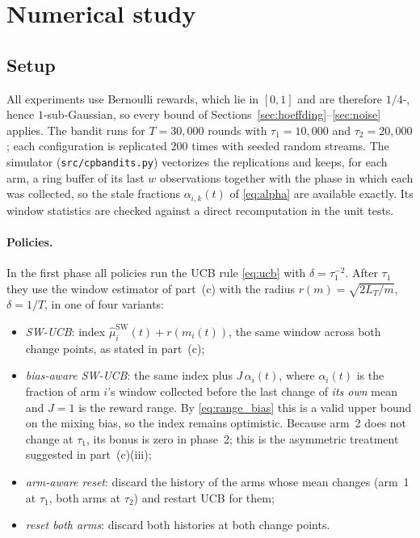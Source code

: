 \section{Numerical study}\label{sec:experiments}

\subsection{Setup}

All experiments use Bernoulli rewards, which lie in $[0,1]$ and are therefore $1/4$-, hence $1$-sub-Gaussian, so every bound of Sections~\ref{sec:hoeffding}--\ref{sec:noise} applies. The bandit runs for $T=30{,}000$ rounds with $\tau_1=10{,}000$ and $\tau_2=20{,}000$; each configuration is replicated $200$ times with seeded random streams. The simulator (\texttt{src/cpbandits.py}) vectorizes the replications and keeps, for each arm, a ring buffer of its last $w$ observations together with the phase in which each was collected, so the stale fractions $\alpha_{i,k}(t)$ of \eqref{eq:alpha} are available exactly. Its window statistics are checked against a direct recomputation in the unit tests.

\paragraph{Policies.} In the first phase all policies run the UCB rule \eqref{eq:ucb} with $\delta=\tau_1^{-2}$. After $\tau_1$ they use the window estimator of part~(c) with the radius $r(m)=\sqrt{2L_T/m}$, $\delta=1/T$, in one of four variants:
\begin{itemize}
\item \emph{SW-UCB}: index $\widehat\mu_i^{\mathrm{SW}}(t)+r(m_i(t))$, the same window across both change points, as stated in part~(c);
\item \emph{bias-aware SW-UCB}: the same index plus $J\,\alpha_i(t)$, where $\alpha_i(t)$ is the fraction of arm $i$'s window collected before the last change of \emph{its own} mean and $J=1$ is the reward range. By \eqref{eq:range_bias} this is a valid upper bound on the mixing bias, so the index remains optimistic. Because arm~2 does not change at $\tau_1$, its bonus is zero in phase~2; this is the asymmetric treatment suggested in part~(c)(iii);
\item \emph{arm-aware reset}: discard the history of the arms whose mean changes (arm~1 at $\tau_1$, both arms at $\tau_2$) and restart UCB for them;
\item \emph{reset both arms}: discard both histories at both change points.
\end{itemize}


